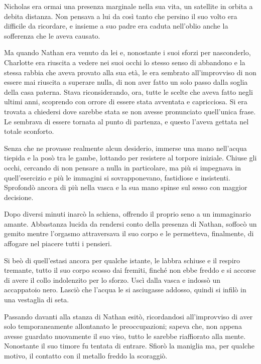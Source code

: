 \documentclass[a4paper,oneside,11pt]{memoir}
\begin{document}
Nicholas era ormai una presenza marginale nella sua vita, un satellite in orbita
a debita distanza. Non pensava a lui da così tanto che persino il suo volto era
difficile da ricordare, e insieme a suo padre era caduta nell'oblio anche la
sofferenza che le aveva causato.

Ma quando Nathan era venuto da lei e, nonostante i suoi sforzi per nasconderlo,
Charlotte era riuscita a vedere nei suoi occhi lo stesso senso di abbandono e la
stessa rabbia che aveva provato alla sua età, le era sembrato all'improvviso di
non essere mai riuscita a superare nulla, di non aver fatto un solo passo dalla
soglia della casa paterna. Stava riconsiderando, ora, tutte le scelte che aveva
fatto negli ultimi anni, scoprendo con orrore di essere stata avventata e
capricciosa. Si era trovata a chiedersi dove sarebbe stata se non avesse
pronunciato quell'unica frase. Le sembrava di essere tornata al punto di
partenza, e questo l'aveva gettata nel totale sconforto.

Senza che ne provasse realmente alcun desiderio, immerse una mano nell'acqua
tiepida e la posò tra le gambe, lottando per resistere al torpore iniziale.
Chiuse gli occhi, cercando di non pensare a nulla in particolare, ma più si
impegnava in quell'esercizio e più le immagini si sovrapponevano, fastidiose e
insistenti. Sprofondò ancora di più nella vasca e la sua mano spinse sul sesso
con maggior decisione.

Dopo diversi minuti inarcò la schiena, offrendo il proprio seno a un immaginario
amante. Abbastanza lucida da rendersi conto della presenza di Nathan, soffocò un
gemito mentre l'orgasmo attraversava il suo corpo e le permetteva, finalmente,
di affogare nel piacere tutti i pensieri.

Si beò di quell'estasi ancora per qualche istante, le labbra schiuse e il
respiro tremante, tutto il suo corpo scosso dai fremiti, finché non ebbe freddo
e si accorse di avere il collo indolenzito per lo sforzo. Uscì dalla vasca e
indossò un accappatoio nero. Lasciò che l'acqua le si asciugasse addosso, quindi
si infilò in una vestaglia di seta.

Passando davanti alla stanza di Nathan esitò, ricordandosi all'improvviso di
aver solo temporaneamente allontanato le preoccupazioni; sapeva che, non appena
avesse guardato nuovamente il suo viso, tutto le sarebbe riaffiorato alla mente.
Nonostante il suo timore fu tentata di entrare. Sfiorò la maniglia ma, per
qualche motivo, il contatto con il metallo freddo la scoraggiò.
\end{document}
